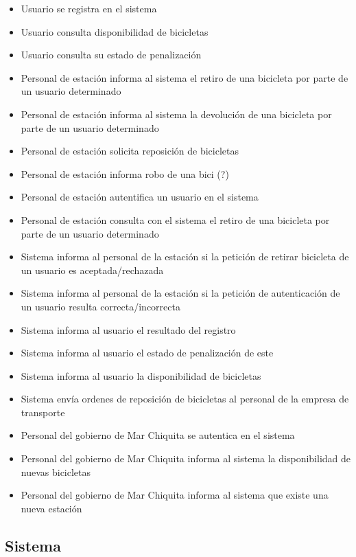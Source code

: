 \documentclass[a4paper, 10pt, twoside]{article}
\begin{document}
\begin{multicols}{2}
  \begin{itemize}
    \item Usuario se registra en el sistema
    \item Usuario consulta disponibilidad de bicicletas
    \item Usuario consulta su estado de penalización
    \item Personal de estación informa al sistema el retiro de una bicicleta por parte de un usuario determinado
    \item Personal de estación informa al sistema la devolución de una bicicleta por parte de un usuario determinado
    \item Personal de estación solicita reposición de bicicletas
    \item Personal de estación informa robo de una bici (?)
    \item Personal de estación autentifica un usuario en el sistema
    \item Personal de estación consulta con el sistema el retiro de una bicicleta por parte de un usuario determinado
    \item Sistema informa al personal de la estación si la petición de retirar bicicleta de un usuario es aceptada/rechazada
    \item Sistema informa al personal de la estación si la petición de autenticación de un usuario resulta correcta/incorrecta
    \item Sistema informa al usuario el resultado del registro
    \item Sistema informa al usuario el estado de penalización de este
    \item Sistema informa al usuario la disponibilidad de bicicletas
    \item Sistema envía ordenes de reposición de bicicletas al personal de la empresa de transporte
    \item Personal del gobierno de Mar Chiquita se autentica en el sistema
    \item Personal del gobierno de Mar Chiquita informa al sistema la disponibilidad de nuevas bicicletas
    \item Personal del gobierno de Mar Chiquita informa al sistema que existe una nueva estación

  \end{itemize}
\end{multicols}


\subsection{Sistema}
\end{document}
